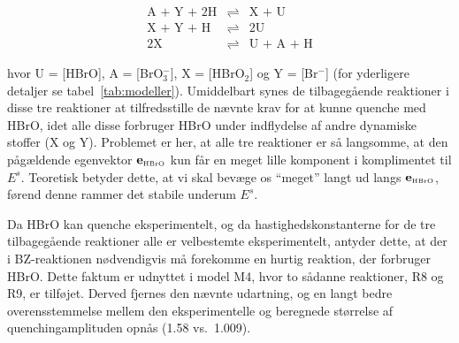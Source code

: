 \begin{eqnarray}
  \mbox{A + Y + 2H} & \rightleftharpoons & \mbox{X + U  } \nonumber\\
  \mbox{X + Y + H } & \rightleftharpoons & \mbox{2U   }   \\
  \mbox{2X        } & \rightleftharpoons & \mbox{U + A + H}\nonumber
\end{eqnarray}

hvor U = [HBrO], A = [BrO$_3^-$], X = [HBrO$_2$] og Y =
[Br$^-$] (for yderligere detaljer se
tabel~\ref{tab:modeller}). Umiddelbart synes de
tilbageg{\aa}ende reaktioner i disse tre reaktioner at
tilfredsstille de n{\ae}vnte krav for at kunne quenche med
HBrO, idet alle disse forbruger HBrO under indflydelse af
andre dynamiske stoffer (X og Y). Problemet er her, at alle
tre reaktioner er s{\aa} langsomme, at den
p{\aa}g{\ae}ldende egenvektor ${\bf e}_{\mbox{\tiny HBrO}}$
kun f{\aa}r en meget lille komponent i komplimentet til
$E^s$. Teoretisk betyder dette, at vi skal bev{\ae}ge os
``meget'' langt ud langs ${\bf e}_{\mbox{\tiny HBrO}}$,
f{\o}rend denne rammer det stabile underum $E^s$.

\vspace{4.0mm}
Da HBrO kan quenche eksperimentelt, og da
hastighedskonstanterne for de tre tilbageg{\aa}ende
reaktioner alle er velbestemte eksperimentelt, antyder
dette, at der i BZ-reaktionen n{\o}dvendigvis m{\aa}
forekomme en hurtig reaktion, der forbruger HBrO. Dette
faktum er udnyttet i model M4, hvor to s{\aa}danne
reaktioner, R8 og R9, er tilf{\o}jet. Derved fjernes den
n{\ae}vnte udartning, og en langt bedre overensstemmelse
mellem den eksperimentelle og beregnede st{\o}rrelse af
quenchingamplituden opn{\aa}s (1.58 vs.\ 1.009).







